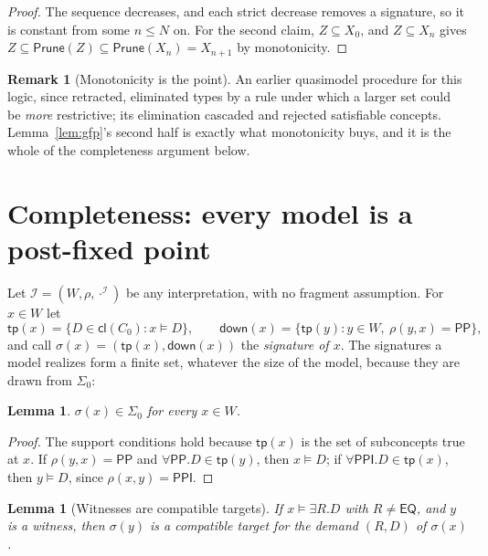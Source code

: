 \documentclass[11pt]{article}
\newcommand{\PP}{\mathsf{PP}}
\newcommand{\PPI}{\mathsf{PPI}}
\newcommand{\EQ}{\mathsf{EQ}}
\newcommand{\cl}{\mathsf{cl}}
\newcommand{\tp}{\mathsf{tp}}
\newcommand{\dn}{\mathsf{down}}
\newcommand{\Prune}{\mathsf{Prune}}
\theoremstyle{plain}
\newtheorem{lemma}[theorem]{Lemma}
\theoremstyle{definition}
\newtheorem{remark}[theorem]{Remark}
\begin{document}
\begin{proof}
The sequence decreases, and each strict decrease removes a signature, so it is
constant from some $n\le N$ on. For the second claim, $Z\subseteq X_0$, and
$Z\subseteq X_n$ gives $Z\subseteq\Prune(Z)\subseteq\Prune(X_n)=X_{n+1}$ by
monotonicity.
\end{proof}

\begin{remark}[Monotonicity is the point]
An earlier quasimodel procedure for this logic, since retracted, eliminated
types by a rule under which a larger set could be \emph{more} restrictive; its
elimination cascaded and rejected satisfiable concepts. Lemma~\ref{lem:gfp}'s
second half is exactly what monotonicity buys, and it is the whole of the
completeness argument below.
\end{remark}

\section{Completeness: every model is a post-fixed point}
\label{sec:completeness}

Let $\mathcal I=(W,\rho,\cdot^{\mathcal I})$ be any interpretation, with no
fragment assumption. For $x\in W$ let
\[
  \tp(x)=\{D\in\cl(C_0) : x\models D\},\qquad
  \dn(x)=\{\tp(y) : y\in W,\ \rho(y,x)=\PP\},
\]
and call $\sigma(x)=(\tp(x),\dn(x))$ the \emph{signature of $x$}. The
signatures a model realizes form a finite set, whatever the size of the model,
because they are drawn from $\Sigma_0$:

\begin{lemma}\label{lem:static}
$\sigma(x)\in\Sigma_0$ for every $x\in W$.
\end{lemma}

\begin{proof}
The support conditions hold because $\tp(x)$ is the set of subconcepts true at
$x$. If $\rho(y,x)=\PP$ and $\forall\PP.D\in\tp(y)$, then $x\models D$; if
$\forall\PPI.D\in\tp(x)$, then $y\models D$, since $\rho(x,y)=\PPI$.
\end{proof}

\begin{lemma}[Witnesses are compatible targets]\label{lem:compat}
If $x\models\exists R.D$ with $R\neq\EQ$, and $y$ is a witness, then $\sigma(y)$
is a compatible target for the demand $(R,D)$ of $\sigma(x)$.
\end{lemma}
\end{document}
